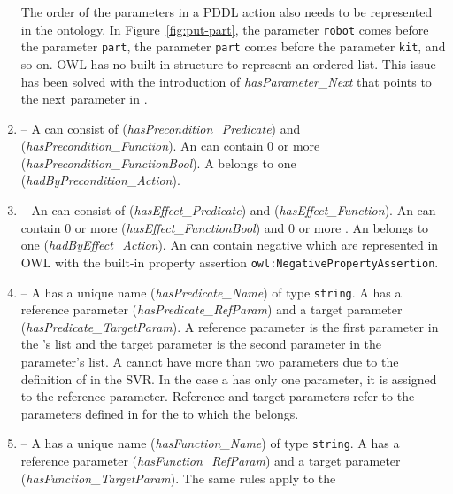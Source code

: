 \begin{enumerate}
    The order of the parameters in a PDDL action also needs to be represented 
in the ontology. In Figure~\ref{fig:put-part}, the parameter \texttt{robot} 
comes before the parameter \texttt{part}, the parameter \texttt{part} comes 
before the parameter \texttt{kit}, and so on. OWL has no built-in structure 
to represent an ordered list. This issue has been solved with the introduction 
of \emph{hasParameter\_Next} that points to the next parameter in .
\item {} -- A  can consist of  
(\emph{hasPrecondition\_Predicate}) and  (\emph{hasPrecondition\_Function}). 
An  can contain 0 or more  
(\emph{hasPrecondition\_FunctionBool}). A  belongs to one  
(\emph{hadByPrecondition\_Action}).
\item {} -- An  can consist of  
(\emph{hasEffect\_Predicate}) and  (\emph{hasEffect\_Function}). 
An  can contain 0 or more  (\emph{hasEffect\_FunctionBool}) 
and 0 or more . An  belongs to one  
(\emph{hadByEffect\_Action}). An  can contain negative  
which are represented in OWL with the built-in property assertion \texttt{owl:NegativePropertyAssertion}.
\item {} -- A  has a unique name (\emph{hasPredicate\_Name}) 
of type \texttt{string}. A  has a reference parameter 
(\emph{hasPredicate\_RefParam}) and a target parameter (\emph{hasPredicate\_TargetParam}). 
A reference parameter is the first parameter in the 's list and the target 
parameter is the second parameter in the parameter's list. A  cannot have 
more than two parameters due to the definition of  in the SVR. In the 
case a  has only one parameter, it is assigned to the reference parameter. 
Reference and target parameters refer to the parameters defined in  
for the  to which the  belongs.
\item {} -- A  has a unique name (\emph{hasFunction\_Name}) 
of type \texttt{string}. A  has a reference parameter (\emph{hasFunction\_RefParam}) 
and a target parameter (\emph{hasFunction\_TargetParam}). The same rules apply to the 

\end{enumerate}
